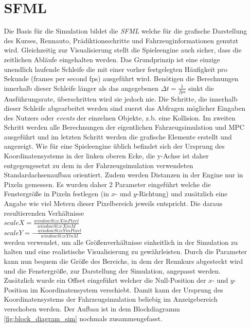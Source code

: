 \documentclass{like}
\begin{document}
\section{\acl{SFML}}
Die Basis für die Simulation bildet die \emph{ \ac{SFML}} welche für die grafische Darstellung des Kurses, Rennauto, Prädiktionsschritte und Fahrzeuginformationen genutzt wird. Gleichzeitig zur Visualisierung stellt die Spieleengine auch sicher, dass die zeitlichen Abläufe eingehalten werden. Das Grundprinzip ist eine einzige unendlich laufende Schleife die mit einer vorher festgelegten Häufigkeit pro Sekunde (frames per second fps) ausgeführt wird. Benötigen die Berechnungen innerhalb dieser Schleife länger als das angegebenen $\Delta t = \frac{1}{fps}$ sinkt die Ausführungsrate, überschritten wird sie jedoch nie. Die Schritte, die innerhalb dieser Schleife abgearbeitet werden sind zuerst das Abfragen möglicher Eingaben des Nutzers oder \emph{events} der einzelnen Objekte, z.b. eine Kollision. Im zweiten Schritt werden alle Berechnungen der eigentlichen Fahrzeugsimulation und \ac{MPC} ausgeführt und im letzten Schritt werden die grafische Elemente erstellt und angezeigt. Wie für eine Spieleengine üblich befindet sich der Ursprung des Koordinatensystems in der linken oberen Ecke, die y-Achse ist daher entgegengesetzt zu dem in der Fahrzeugsimulation verwendeten Standardachsenaufbau orientiert. Zudem werden Distanzen in der Engine nur in Pixeln gemessen. Es wurden daher 2 Parameter eingeführt welche die Fenstergröße in Pixeln festlegen (in \(x\)- und  \(y\)-Richtung)
und zusätzlich eine Angabe wie viel Metern dieser Pixelbereich jeweils entspricht. Die daraus resultierenden Verhältnisse \\
$scaleX = \frac{windowSizeXinPixel}{windowSizeXinM}$ \\
$scaleY = - \frac{windowSizeYinPixel}{windowSizeYinM}$ \\
werden verwendet, um alle Größenverhältnisse einheitlich in der Simulation zu halten und eine realistische Visualisierung zu gewährleisten. Durch die Parameter kann nun bequem die Größe des Bereichs, in dem der Rennkurs abgesteckt wird und die Fenstergröße, zur Darstellung der Simulation, angepasst werden. Zusätzlich wurde ein Offset eingeführt welcher die Null-Position der \(x\)- und \(y\)- Position im Koordinatensystem verschiebt. Damit kann der Ursprung des Koordinatensystems der Fahrzeugsimulation beliebig im Anzeigebereich verschoben werden. 
Der Aufbau ist in dem Blockdiagramm \ref{fig:block_diagram_sim} nochmals zusammengefasst. 
\end{document}
